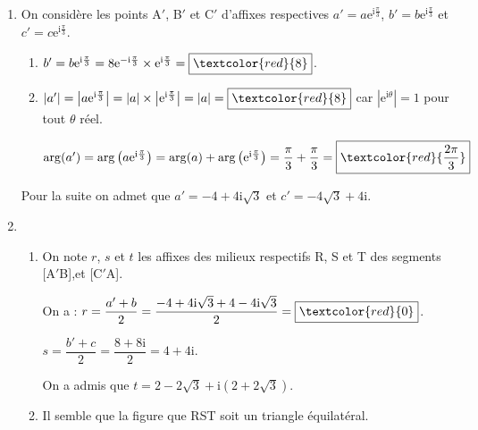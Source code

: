\documentclass[12pt]{article}
\begin{document}
\begin{enumerate}

\item On considère les points A$'$, B$'$ et C$'$ d'affixes respectives $a' = a \text{e}^{\text{i}\frac{\pi}{3}}$, $b' = b\text{e}^{\text{i}\frac{\pi}{3}}$ et $c' = c\text{e}^{\text{i}\frac{\pi}{3}}$.
	\begin{enumerate}
		\item %
		$b'=b\mathrm{e}^{\mathrm{i}\frac\pi3}=8\mathrm{e}^{-\mathrm{i}\frac\pi3}\times \mathrm{e}^{\mathrm{i}\frac\pi3}=\boxed{\textcolor{red}{8}}$.
		
		\item %
		$\vert a' \vert=\left\vert a\mathrm{e}^{\mathrm{i}\frac\pi3} \right\vert=\vert a \vert\times \left\vert \mathrm{e}^{\mathrm{i}\frac\pi3} \right\vert=\vert a \vert=\boxed{\textcolor{red}{8}}$ car $\left\vert \mathrm{e}^{\mathrm{i}\theta}\right \vert=1$ pour tout $\theta$ réel.
		
		$\arg(a')=\arg\left(a\mathrm{e}^{\mathrm{i}\frac\pi3}\right)=\arg(a)+\arg\left(\mathrm{e}^{\mathrm{i}\frac\pi3}\right)=\dfrac{\pi}{3}+\dfrac{\pi}{3}=\boxed{\textcolor{red}{\dfrac{2\pi}{3}}}$
	\end{enumerate}
			
Pour la suite on admet que $a' = -4 + 4\text{i}\sqrt{3}$ et $c' = - 4\sqrt{3} + 4\text{i}$.

\item %
	\begin{enumerate}
		\item On note $r$, $s$ et $t$ les affixes des milieux respectifs R, S et T des segments [A$'$B],\: [B$'$C] et [C$'$A].
		
On a : $r=\dfrac{a'+b}{2}=\dfrac{-4+4\mathrm{i}\sqrt{3}+4-4\mathrm{i}\sqrt{3}}{2}=\boxed{\textcolor{red}{0}}$.

\noindent $s=\dfrac{b'+c}{2}=\dfrac{8+8\mathrm{i}}{2}=4+4\mathrm{i}$.

\noindent On a admis que $t = 2 - 2\sqrt{3} + \text{i}\left(2 + 2\sqrt{3}\right)$.

		\item %
		Il semble que la figure que RST soit un triangle équilatéral.
		

\end{enumerate}
\end{enumerate}
\end{document}
